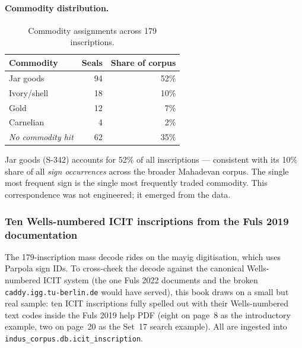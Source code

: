 \paragraph{Commodity distribution.}

\begin{longtable}{@{}lrr@{}}
\caption{Commodity assignments across 179 inscriptions.}
\label{tab:commodity-dist}\\
\toprule
Commodity & Seals & Share of corpus \\
\midrule
\endfirsthead
\bottomrule
\endlastfoot
Jar goods & 94 & 52\% \\
\midrule
Ivory/shell & 18 & 10\% \\
\midrule
Gold & 12 & 7\% \\
\midrule
Carnelian & 4 & 2\% \\
\midrule
\textit{No commodity hit} & 62 & 35\% \\
\end{longtable}

\noindent
Jar goods (S-342) accounts for 52\% of all inscriptions ---
consistent with its 10\% share of all \emph{sign occurrences}
across the broader Mahadevan corpus. The single most frequent
sign is the single most frequently traded commodity. This
correspondence was not engineered; it emerged from the data.

\subsubsection*{Ten Wells-numbered ICIT inscriptions from the Fuls
2019 documentation}

The 179-inscription mass decode rides on the mayig digitisation,
which uses Parpola sign IDs. To cross-check the decode against the
canonical Wells-numbered ICIT system (the one Fuls 2022 documents
and the broken \texttt{caddy.igg.tu-berlin.de} would have served),
this book draws on a small but real sample: ten ICIT inscriptions
fully spelled out with their Wells-numbered text codes inside the
Fuls 2019 help PDF\smartcite{WellsFuls2006} (eight on page~8 as
the introductory example, two on page~20 as the Set~17 search
example). All are ingested into
\texttt{indus\_corpus.db.icit\_inscription}.

